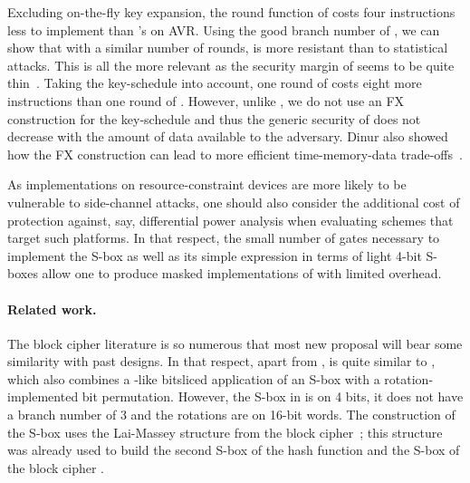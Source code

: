 Excluding on-the-fly key expansion, the round function of \fly costs four instructions less to implement than \pride's on AVR. Using the
good branch number of \littlunOne, we can show that with a similar number of rounds, \fly is more resistant than \pride
to statistical attacks. This is all the more relevant as the security margin of \pride seems to be quite
thin~\cite{prideattack}. Taking the key-schedule into account, one round of \fly costs eight more instructions
than one round of \pride. However, unlike \pride, we do not use an FX construction for the key-schedule and thus
the generic security of \fly does not decrease with the amount of data available
to the adversary. Dinur also showed how the FX construction can lead to more efficient time-memory-data trade-offs~\cite{itaitmd}.

As implementations on resource-constraint devices are more likely to be vulnerable to side-channel attacks, one should also consider
the additional cost of protection against, say, differential power analysis when evaluating schemes that target such platforms.
In that respect, the small number of gates
necessary to implement the \littlunOne S-box as well as its simple expression in terms of light 4-bit S-boxes allow one to produce
masked implementations of \fly with limited overhead.

\paragraph{Related work.} The block cipher literature is so numerous that most new proposal will bear some similarity with past
designs. In that respect, apart from \present, \fly is quite similar to \rectangle \cite{rectangle}, which also combines a \serpent-like
bitsliced application of an S-box \cite{serpent} with a rotation-implemented bit permutation. However, the S-box in \rectangle is on 4 bits, it does
not have a branch number of 3 and the rotations are on 16-bit words. The construction of the \littlun S-box uses
the Lai-Massey structure from the \idea block cipher~\cite{idea}; this structure was already used to build the second S-box
of the \whirlpool hash function \cite{whirlpool} and the S-box of the block cipher \fox \cite{fox}.
